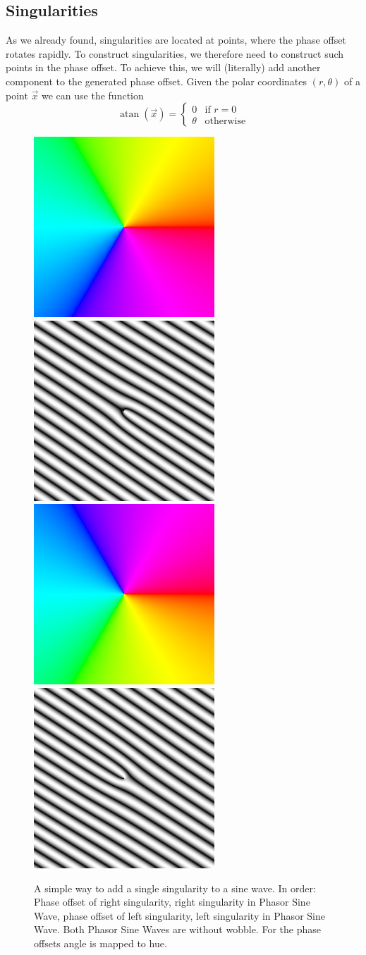 \documentclass{utue} %
\DeclareMathOperator{\atan}{atan}
\begin{document}
\subsection{Singularities}\label{sec:singularities}
As we already found, singularities are located at points, where the phase offset rotates rapidly. To construct singularities, we therefore need to construct such points in the phase offset. To achieve this, we will (literally) add another component to the generated phase offset. Given the polar coordinates $(r, \theta)$ of a point $\vec{x}$ we can use the function
$$
\atan(\vec{x}) = \begin{cases}
  0 & \text{if } r = 0\\
  \theta &\text{otherwise}
\end{cases}
$$

\begin{figure}[ht]
  \centering
  \includegraphics[width=0.235\linewidth]{images/rightSingularityPhase}
  \includegraphics[width=0.235\linewidth]{images/rightSingularity}
  \hfill
  \includegraphics[width=0.235\linewidth]{images/leftSingularityPhase}
  \includegraphics[width=0.235\linewidth]{images/leftSingularity}
  \caption{A simple way to add a single singularity to a sine wave. In order: Phase offset of right singularity, right singularity in Phasor Sine Wave, phase offset of left singularity, left singularity in Phasor Sine Wave. Both Phasor Sine Waves are without wobble. For the phase offsets angle is mapped to hue.}\label{fig:singularities}
\end{figure}
\end{document}
